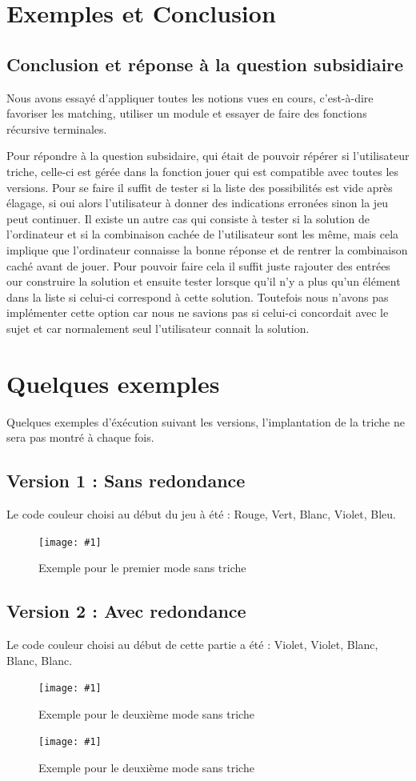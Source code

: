 \documentclass[a4paper,twoside,12pt]{report}
\newcommand{\monimage}[3]{
\par\noindent
\begin{figure}[H] %
\begin{center}
\texttt{[image: \#1]} %
\caption{#2} %
\label{#3} %
\end{center}
\end{figure} %
}
\begin{document}
\chapter{Exemples et Conclusion}
%
\section{Conclusion et réponse à la question subsidiaire}
\par Nous avons essayé d'appliquer toutes les notions vues en cours, c'est-à-dire favoriser les matching, utiliser un module et essayer de faire des fonctions récursive terminales.
\par Pour répondre à la question subsidaire, qui était de pouvoir répérer si l'utilisateur triche, celle-ci est gérée dans la fonction jouer qui est compatible avec toutes les versions. Pour se faire il suffit de tester si la liste des possibilités est vide après élagage, si oui alors l'utilisateur à donner des indications erronées sinon la jeu peut continuer. Il existe un autre cas qui consiste à tester si la solution de l'ordinateur et si la combinaison cachée de l'utilisateur sont les même, mais cela implique que l'ordinateur connaisse la bonne réponse et de rentrer la combinaison caché avant de jouer. Pour pouvoir faire cela il suffit juste rajouter des entrées our construire la solution et ensuite tester lorsque qu'il n'y a plus qu'un élément dans la liste si celui-ci correspond à cette solution. Toutefois nous n'avons pas implémenter cette option car nous ne savions pas si celui-ci concordait avec le sujet et car normalement seul l'utilisateur connait la solution.

\chapter*{Quelques exemples}
Quelques exemples d'éxécution suivant les versions, l'implantation de la triche ne sera pas montré à chaque fois.
\section*{Version 1 : Sans redondance}
Le code couleur choisi au début du jeu à été : Rouge, Vert, Blanc, Violet, Bleu.
\monimage{mode1sanstriche.png}{Exemple pour le premier mode sans triche}{M1ST}
\section*{Version 2 : Avec redondance}
Le code couleur choisi au début de cette partie a été : Violet, Violet, Blanc, Blanc, Blanc.
\monimage{mode2sanstriche_1.png}{Exemple pour le deuxième mode sans triche}{M2ST}
\monimage{mode2sanstriche_2.png}{Exemple pour le deuxième mode sans triche}{M2ST}
\end{document}
